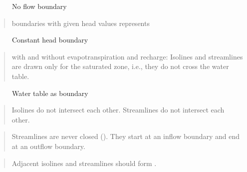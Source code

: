 \documentclass[letterpaper,10pt,english]{jupyterBook}
\begin{document}
\begin{figure}[htbp]
\centering
\capstart

\noindent{}
\caption{No flow boundary}\label{\detokenize{content/flow/L6/16_darcy_law_3D:flow-net}}\end{figure}
\begin{quote}

\sphinxAtStartPar
{} boundaries with given head values represents 
\end{quote}

\begin{figure}[htbp]
\centering
\capstart

\noindent{}
\caption{Constant head boundary}\label{\detokenize{content/flow/L6/16_darcy_law_3D:id2}}\end{figure}
\begin{quote}

\sphinxAtStartPar
{} with and without evapotranspiration and recharge: Isolines and streamlines are drawn only for the saturated zone, i.e., they do not cross the water table.
\end{quote}

\begin{figure}[htbp]
\centering
\capstart

\noindent{}
\caption{Water table as boundary}\label{\detokenize{content/flow/L6/16_darcy_law_3D:id3}}\end{figure}
\begin{quote}

\sphinxAtStartPar
Isolines do not intersect each other. Streamlines do not intersect each other.
\end{quote}
\begin{quote}

\sphinxAtStartPar
Streamlines are never closed (). They start at an inflow boundary and end at an outflow boundary.
\end{quote}
\begin{quote}

\sphinxAtStartPar
Adjacent isolines and streamlines should form .
\end{quote}
\end{document}
